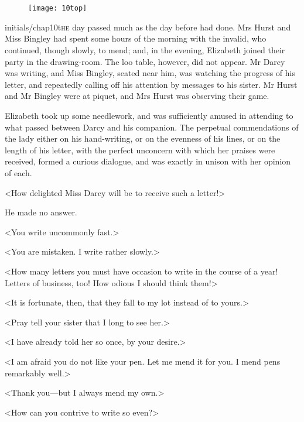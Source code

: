 \chapter[Chapter \thechapter]{}
\begin{figure}[t!]
\centering
\texttt{[image: 10top]}
\end{figure}

\lettrine[lines=6,image=true]{initials/chap10t}{he}  day passed much as the day before had done. Mrs Hurst and Miss Bingley had spent some hours of the morning with the invalid, who continued, though slowly, to mend; and, in the evening, Elizabeth joined their party in the drawing-room. The loo table, however, did not appear. Mr Darcy was writing, and Miss Bingley, seated near him, was watching the progress of his letter, and repeatedly calling off his attention by messages to his sister. Mr Hurst and Mr Bingley were at piquet, and Mrs Hurst was observing their game.

Elizabeth took up some needlework, and was sufficiently amused in attending to what passed between Darcy and his companion. The perpetual commendations of the lady either on his hand-writing, or on the evenness of his lines, or on the length of his letter, with the perfect unconcern with which her praises were received, formed a curious dialogue, and was exactly in unison with her opinion of each.

<How delighted Miss Darcy will be to receive such a letter!>

He made no answer.

<You write uncommonly fast.>

<You are mistaken. I write rather slowly.>

<How many letters you must have occasion to write in the course of a year! Letters of business, too! How odious I should think them!>

<It is fortunate, then, that they fall to my lot instead of to yours.>

<Pray tell your sister that I long to see her.>

<I have already told her so once, by your desire.>

<I am afraid you do not like your pen. Let me mend it for you. I mend pens remarkably well.>

<Thank you—but I always mend my own.>

<How can you contrive to write so even?>

